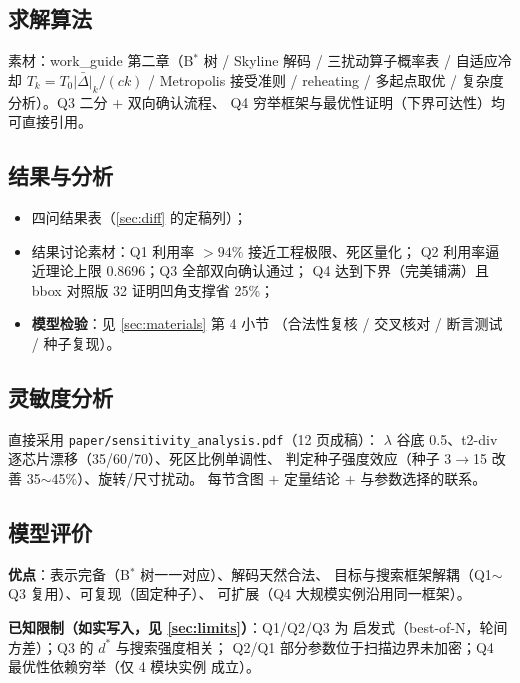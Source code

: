 \documentclass[12pt,a4paper]{article}
\begin{document}
\subsection{求解算法}

素材：work\_guide 第二章（B$^*$ 树 / Skyline 解码 / 三扰动算子概率表 /
自适应冷却 $T_k = T_0\bar{|\Delta|}_k/(ck)$ / Metropolis 接受准则 /
reheating / 多起点取优 / 复杂度分析）。Q3 二分 + 双向确认流程、
Q4 穷举框架与最优性证明（下界可达性）均可直接引用。

\subsection{结果与分析}

\begin{itemize}
    \item 四问结果表（\ref{sec:diff} 的定稿列）；
    \item 结果讨论素材：Q1 利用率 $>94\%$ 接近工程极限、死区量化；
    Q2 利用率逼近理论上限 0.8696；Q3 全部双向确认通过；
    Q4 达到下界（完美铺满）且 bbox 对照版 32 证明凹角支撑省 25\%；
    \item \textbf{模型检验}：见 \ref{sec:materials} 第 4 小节
    （合法性复核 / 交叉核对 / 断言测试 / 种子复现）。
\end{itemize}

\subsection{灵敏度分析}

直接采用 \texttt{paper/sensitivity\_analysis.pdf}（12 页成稿）：
$\lambda$ 谷底 0.5、t2-div 逐芯片漂移（35/60/70）、死区比例单调性、
判定种子强度效应（种子 3$\to$15 改善 35$\sim$45\%）、旋转/尺寸扰动。
每节含图 + 定量结论 + 与参数选择的联系。

\subsection{模型评价}

\textbf{优点}：表示完备（B$^*$ 树一一对应）、解码天然合法、
目标与搜索框架解耦（Q1$\sim$Q3 复用）、可复现（固定种子）、
可扩展（Q4 大规模实例沿用同一框架）。

\textbf{已知限制（如实写入，见 \ref{sec:limits}）}：Q1/Q2/Q3 为
启发式（best-of-N，轮间方差）；Q3 的 $d^*$ 与搜索强度相关；
Q2/Q1 部分参数位于扫描边界未加密；Q4 最优性依赖穷举（仅 4 模块实例
成立）。

\end{document}
